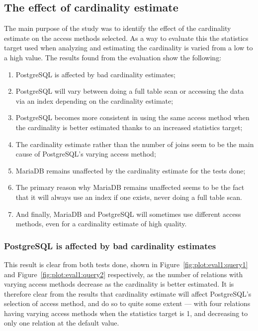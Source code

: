 \subsection{The effect of cardinality estimate}
The main purpose of the study was to identify the effect of the cardinality
estimate on the access methods selected. As a way to evaluate this the statistics
target used when analyzing and estimating the cardinality is varied from a low
to a high value. The results found from the evaluation show the following:

\begin{enumerate}
\item PostgreSQL is affected by bad cardinality estimates;
\item PostgreSQL will vary between doing a full table scan or accessing the data
  via an index depending on the cardinality estimate;
\item PostgreSQL becomes more consistent in using the same access method when
  the cardinality is better estimated thanks to an increased statistics target;
\item The cardinality estimate rather than the number of joins seem to be the
  main cause of PostgreSQL's varying access method;
\item MariaDB remains unaffected by the cardinality estimate for the tests done;
\item The primary reason why MariaDB remains unaffected seems to be the fact
  that it will always use an index if one exists, never doing a full table scan.
\item And finally, MariaDB and PostgreSQL will sometimes use different access
  methods, even for a cardinality estimate of high quality.
\end{enumerate}


\subsubsection{PostgreSQL is affected by bad cardinality estimates}
This result is clear from both tests done, shown in
Figure~\ref{fig:plot:eval1:query1} and Figure~\ref{fig:plot:eval1:query2}
respectively, as the number of relations with varying access methods decrease as
the cardinality is better estimated. It is therefore clear from the results that
cardinality estimate will affect PostgreSQL's selection of access method, and do
so to quite some extent --- with four relations having varying access methods
when the statistics target is 1, and decreasing to only one relation at the
default value.

